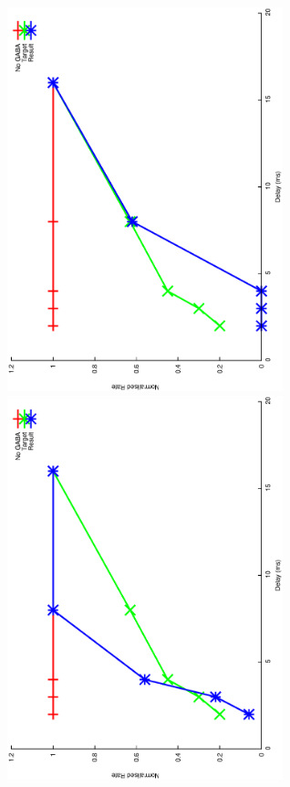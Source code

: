 \documentclass{article}
\begin{document}
\includegraphics[keepaspectratio=true,angle=-90,width=0.6\textwidth]{DS_ClickRecovery_result.21.eps}\clearpage
\includegraphics[keepaspectratio=true,angle=-90,width=0.6\textwidth]{DS_ClickRecovery_result.22.eps}\clearpage
\end{document}
